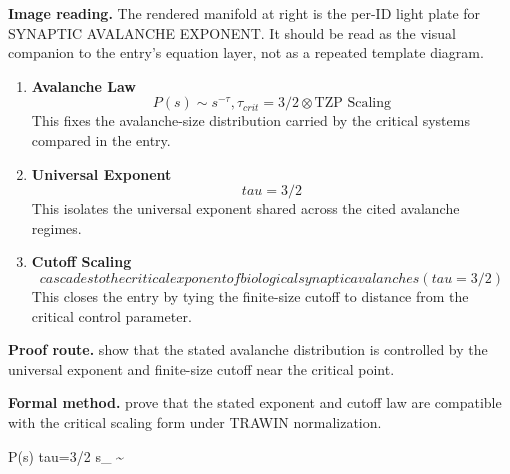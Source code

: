 \begin{samepage}
\noindent\begin{minipage}[t]{0.45\linewidth}
\vspace{0pt}
\raggedright
\scriptsize\textbf{Image reading.} The rendered manifold at right is the per-ID light plate for SYNAPTIC AVALANCHE EXPONENT. It should be read as the visual companion to the entry's equation layer, not as a repeated template diagram.\par
\end{minipage}\hfill
\begin{minipage}[t]{0.53\linewidth}
\vspace*{-0.10in}
\raggedright
{}
\end{minipage}
\end{samepage}

\clearpage


\begin{enumerate}[leftmargin=1.6em,itemsep=9pt,topsep=6pt]
\item \textbf{Avalanche Law}
\[
P(s) \sim s^{-\tau}, \tau_{crit} = 3/2 \otimes \text{TZP Scaling}
\]
This fixes the avalanche-size distribution carried by the critical systems compared in the entry.

\item \textbf{Universal Exponent}
\[
tau=3/2
\]
This isolates the universal exponent shared across the cited avalanche regimes.

\item \textbf{Cutoff Scaling}
\[
cascades to the critical exponent of biological synaptic avalanches (tau=3/2)
\]
This closes the entry by tying the finite-size cutoff to distance from the critical control parameter.
\end{enumerate}

\textbf{Proof route.} show that the stated avalanche distribution is controlled by the universal exponent and finite-size cutoff near the critical point.

\textbf{Formal method.} prove that the stated exponent and cutoff law are compatible with the critical scaling form under TRAWIN normalization.

\medskip
{}

\begin{tzpsnapshot}
\end{tzpsnapshot}

\tzpequationlinks
  {P(s) \propto \cdots}
  {tau=3/2}
  {s_{} \sim \cdots}
